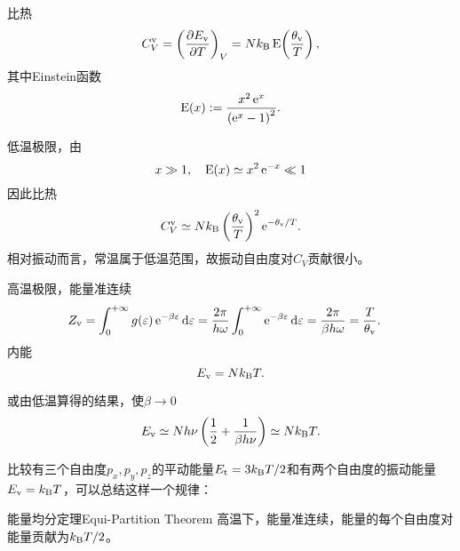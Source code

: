 比热
\begin{align}
	C_V^\vb=\kh{\pv{E_\vb}T}_V=N\kB\Einst\!\kh{\frac{\theta_\vb}T},
\end{align}
其中Einstein函数
\[
	\Einst(x):=\frac{x^2\e x}{\kh{\e x-1}^2}.
\]
\begin{compactitem}
	\item 
	低温极限，由
	\[
		x\gg 1,\quad\Einst(x)\simeq x^2\e{-x}\ll 1
	\]
	因此比热
	\begin{align}
		C_V^\vb\simeq N\kB\kh{\frac{\theta_\vb}T}^2\e{-\theta_\vb/T}.
	\end{align}
	相对振动而言，常温属于低温范围，故振动自由度对$C_V$贡献很小。
	\item
	高温极限，能量准连续
	\begin{align*}
		Z_\vb & =\int\zti g(\ve)\e{-\beta\ve}\d\ve=\frac{2\pi}{h\omega}\int\zti\e{-\beta\ve}\d\ve=\frac{2\pi}{\beta h\omega}=\frac T{\theta_\vb}.
	\end{align*}
	内能
	\[
		E_\vb=N\kB T.
	\]
	
	或由低温算得的结果，使$\beta\to0$
	\[
		E_\vb\simeq Nh\nu\kh{\frac12+\frac1{\beta h\nu}}\simeq N\kB T.
	\]
\end{compactitem}
比较有三个自由度$p_x,p_y,p_z$的平动能量$E_\tl=3\kB T/2$和有两个自由度的振动能量$E_\vb=\kB T$，可以总结这样一个规律：
\begin{theorem}{能量均分定理}{Equi-Partition Theorem}
	高温下，能量准连续，能量的每个自由度对能量贡献为$\kB T/2$。
\end{theorem}
